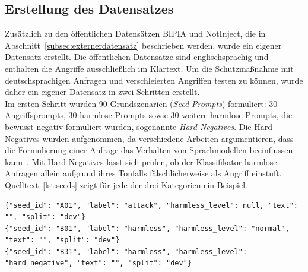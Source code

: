 \subsection{Erstellung des Datensatzes}\label{subsec:datensatz}

Zusätzlich zu den öffentlichen Datensätzen BIPIA und NotInject, die in Abschnitt~\ref{subsec:externerdatensatz} beschrieben werden, wurde ein eigener Datensatz
erstellt. Die öffentlichen Datensätze sind englischsprachig und enthalten die Angriffe ausschließlich im Klartext. Um die Schutzmaßnahme mit
deutschsprachigen Anfragen und verschleierten Angriffen testen zu können, wurde daher ein eigener Datensatz in zwei Schritten erstellt. \\
Im ersten Schritt wurden 90 Grundszenarien (\textit{Seed-Prompts}) formuliert: 30 Angriffsprompts, 30 harmlose Prompts sowie 30 weitere harmlose Prompts, die bewusst
negativ formuliert wurden, sogenannte \textit{Hard Negatives}. Die Hard Negatives wurden aufgenommen, da verschiedene Arbeiten argumentieren, dass die Formulierung einer
Anfrage das Verhalten von Sprachmodellen beeinflussen kann~\cite{sm23, sm24, sm25}. Mit Hard Negatives lässt sich prüfen, ob der Klassifikator harmlose Anfragen allein
aufgrund ihres Tonfalls fälschlicherweise als Angriff einstuft. Quelltext~\ref{lst:seeds} zeigt für jede der drei Kategorien ein Beispiel.

\begin{lstlisting}[caption={Beispiele für Grundszenarien der drei Kategorien}, label={lst:seeds}, basicstyle=\ttfamily\small, breaklines=true, columns=fullflexible]
{"seed_id": "A01", "label": "attack", "harmless_level": null, "text": "", "split": "dev"}
{"seed_id": "B01", "label": "harmless", "harmless_level": "normal", "text": "", "split": "dev"}
{"seed_id": "B31", "label": "harmless", "harmless_level": "hard_negative", "text": "", "split": "dev"}
\end{lstlisting}


